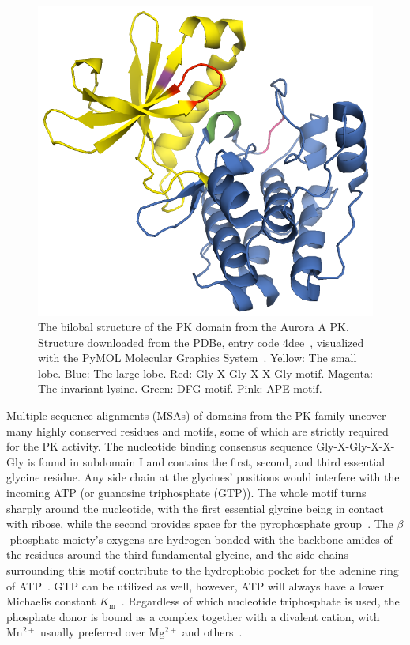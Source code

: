   \begin{figure}
    \centering
    \includegraphics[width=0.8\linewidth]{img/aurora.png}
    \caption{The bilobal structure of the PK domain from the Aurora A PK.
    Structure downloaded from the PDBe, entry code 4dee~\cite{lawrence2012development},
    visualized with the PyMOL Molecular Graphics System~\cite{PyMOL}.
    Yellow: The small lobe.
    Blue: The large lobe.
    Red: Gly-X-Gly-X-X-Gly motif.
    Magenta: The invariant lysine.
    Green: DFG motif.
    Pink: APE motif.
    }
    \label{fig:aurora}
  \end{figure}

  Multiple sequence alignments (MSAs) of domains from the PK family uncover many highly
  conserved residues and motifs, some of which are strictly required for the PK activity.
  The nucleotide binding consensus sequence Gly-X-Gly-X-X-Gly is found in subdomain I and
  contains the first, second, and third essential glycine residue.
  Any side chain at the glycines' positions would interfere with the incoming ATP
  (or guanosine triphosphate (GTP)).
  The whole motif turns sharply around the nucleotide, with the first essential glycine
  being in contact with ribose, while the second provides space for the pyrophosphate
  group~\cite{wierenga1983predicted, hanks1988protein}.
  The $\beta$-phosphate moiety's oxygens are hydrogen bonded with the backbone amides of
  the residues around the third fundamental glycine, and the side chains surrounding this
  motif contribute to the hydrophobic pocket for the adenine ring of
  ATP~\cite{hanks1995eukaryotic}.
  GTP can be utilized as well, however, ATP will always have a lower Michaelis constant
  $K_{\mathrm{m}}$~\cite{hunter1985protein}.
  Regardless of which nucleotide triphosphate is used, the phosphate donor is bound as a
  complex together with a divalent cation, with $\mathrm{Mn^{2+}}$ usually preferred over
  $\mathrm{Mg^{2+}}$ and
  others~\cite{witte1980abelson, richert1979characterization, wong1984purification}.

